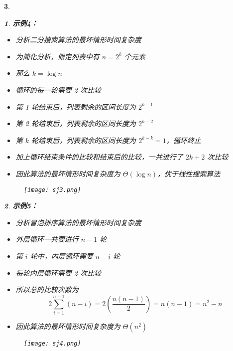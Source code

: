 \documentclass[UTF8]{report}
\theoremstyle{MyLineTheoremStyle} %
\theoremstyle{MyBlockTheoremStyle} %
\theoremstyle{MySubsubsectionStyle} %
\newtheorem{definition}{}
\begin{document}
\begin{definition}
\begin{definition}
    \textbf{示例4：}
    \begin{itemize}
        \item 分析二分搜索算法的最坏情形时间复杂度
        \item 为简化分析，假定列表中有 $n = 2^k$ 个元素
        \item 那么 $k = \log n$
        \item 循环的每一轮需要 2 次比较
        \item 第 1 轮结束后，列表剩余的区间长度为 $2^{k-1}$
        \item 第 2 轮结束后，列表剩余的区间长度为 $2^{k-2}$
        \item 第 $k$ 轮结束后，列表剩余的区间长度为 $2^{k-k} = 1$，循环终止
        \item 加上循环结束条件的比较和结束后的比较，一共进行了 $2k + 2$ 次比较
        \item 因此算法的最坏情形时间复杂度为 $\Theta(\log n)$，优于线性搜索算法
    \end{itemize}

    \begin{figure}[ht]
        \centering
        \texttt{[image: sj3.png]}
    \end{figure}
\end{definition}

\begin{definition}
    \textbf{示例5：}
    \begin{itemize}
        \item 分析冒泡排序算法的最坏情形时间复杂度
        \item 外层循环一共要进行 $n - 1$ 轮
        \item 第 $i$ 轮中，内层循环需要 $n - i$ 轮
        \item 每轮内层循环需要 2 次比较
        \item 所以总的比较次数为
        \[
        2 \sum_{i=1}^{n-1} (n - i) = 2 \left( \frac{n(n-1)}{2} \right) = n(n-1) = n^2 - n
        \]
        \item 因此算法的最坏情形时间复杂度为 $\Theta(n^2)$
    \end{itemize}

    \begin{figure}[ht]
        \centering
        \texttt{[image: sj4.png]}
    \end{figure}
\end{definition}


\end{definition}
\end{document}
